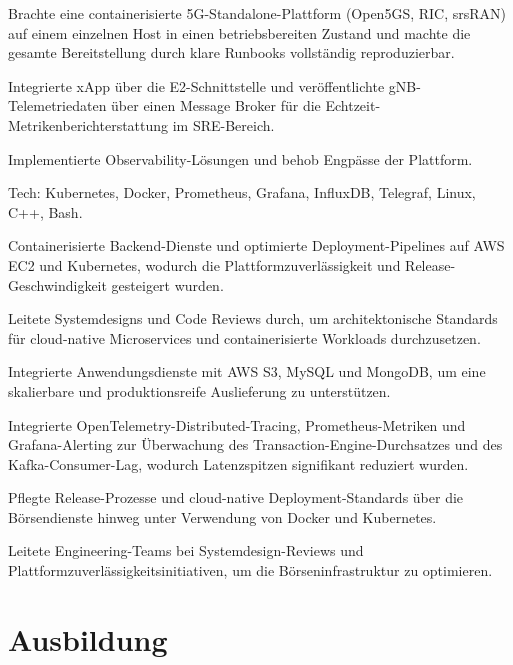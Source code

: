 \documentclass[10pt,a4paper]{resume}
\begin{document}
\bullets
  \item Brachte eine containerisierte 5G-Standalone-Plattform (Open5GS, RIC, srsRAN) auf einem einzelnen Host in einen betriebsbereiten Zustand und machte die gesamte Bereitstellung durch klare Runbooks vollständig reproduzierbar.
  \item Integrierte xApp über die E2-Schnittstelle und veröffentlichte gNB-Telemetriedaten über einen Message Broker für die Echtzeit-Metrikenberichterstattung im SRE-Bereich.
  \item Implementierte Observability-Lösungen und behob Engpässe der Plattform.
  \item Tech: Kubernetes, Docker, Prometheus, Grafana, InfluxDB, Telegraf, Linux, C++, Bash.
\bulletsend
\vspace{1.5pt}
\bullets
  \item Containerisierte Backend-Dienste und optimierte Deployment-Pipelines auf AWS EC2 und Kubernetes, wodurch die Plattformzuverlässigkeit und Release-Geschwindigkeit gesteigert wurden.
  \item Leitete Systemdesigns und Code Reviews durch, um architektonische Standards für cloud-native Microservices und containerisierte Workloads durchzusetzen.
  \item Integrierte Anwendungsdienste mit AWS S3, MySQL und MongoDB, um eine skalierbare und produktionsreife Auslieferung zu unterstützen.
\bulletsend
\vspace{1.5pt}
\bullets
  \item Integrierte OpenTelemetry-Distributed-Tracing, Prometheus-Metriken und Grafana-Alerting zur Überwachung des Transaction-Engine-Durchsatzes und des Kafka-Consumer-Lag, wodurch Latenzspitzen signifikant reduziert wurden.
  \item Pflegte Release-Prozesse und cloud-native Deployment-Standards über die Börsendienste hinweg unter Verwendung von Docker und Kubernetes.
  \item Leitete Engineering-Teams bei Systemdesign-Reviews und Plattformzuverlässigkeitsinitiativen, um die Börseninfrastruktur zu optimieren.
\bulletsend
\vspace{1.5pt}

\section{Ausbildung}
\end{document}
